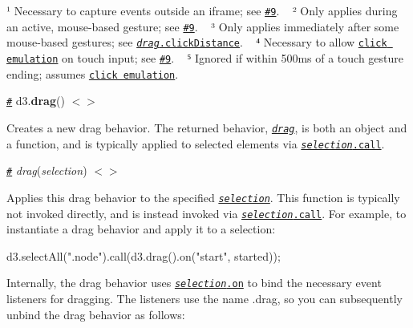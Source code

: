 ¹ Necessary to capture events outside an iframe; see \href{https://github.com/d3/d3-drag/issues/9}{\tt \#9}. ~\newline
² Only applies during an active, mouse-\/based gesture; see \href{https://github.com/d3/d3-drag/issues/9}{\tt \#9}. ~\newline
³ Only applies immediately after some mouse-\/based gestures; see \href{#drag_clickDistance}{\tt {\itshape drag}.click\+Distance}. ~\newline
⁴ Necessary to allow \href{https://developer.apple.com/library/ios/documentation/AppleApplications/Reference/SafariWebContent/HandlingEvents/HandlingEvents.html#//apple_ref/doc/uid/TP40006511-SW7}{\tt click emulation} on touch input; see \href{https://github.com/d3/d3-drag/issues/9}{\tt \#9}. ~\newline
⁵ Ignored if within 500ms of a touch gesture ending; assumes \href{https://developer.apple.com/library/ios/documentation/AppleApplications/Reference/SafariWebContent/HandlingEvents/HandlingEvents.html#//apple_ref/doc/uid/TP40006511-SW7}{\tt click emulation}.

\href{#drag}{\tt \#} d3.{\bfseries drag}() \href{https://github.com/d3/d3-drag/blob/master/src/drag.js}{\tt $<$$>$}

Creates a new drag behavior. The returned behavior, \href{#_drag}{\tt {\itshape drag}}, is both an object and a function, and is typically applied to selected elements via \href{https://github.com/d3/d3-selection#selection_call}{\tt {\itshape selection}.call}.

\href{#_drag}{\tt \#} {\itshape drag}({\itshape selection}) \href{https://github.com/d3/d3-drag/blob/master/src/drag.js#L39}{\tt $<$$>$}

Applies this drag behavior to the specified \href{https://github.com/d3/d3-selection}{\tt {\itshape selection}}. This function is typically not invoked directly, and is instead invoked via \href{https://github.com/d3/d3-selection#selection_call}{\tt {\itshape selection}.call}. For example, to instantiate a drag behavior and apply it to a selection\+:


\begin{DoxyCode}
d3.selectAll(".node").call(d3.drag().on("start", started));
\end{DoxyCode}


Internally, the drag behavior uses \href{https://github.com/d3/d3-selection#selection_on}{\tt {\itshape selection}.on} to bind the necessary event listeners for dragging. The listeners use the name {\ttfamily .drag}, so you can subsequently unbind the drag behavior as follows\+:


